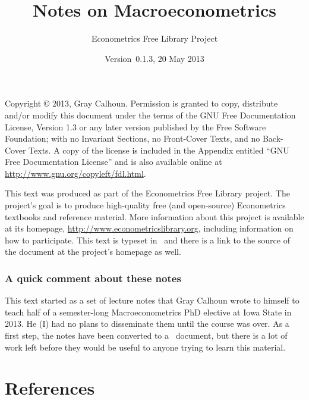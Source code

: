 \documentclass{tex/tufte-handout}
\title{Notes on Macroeconometrics}
\author{Econometrics Free Library Project}
\date{Version~0.1.3, 20 May 2013}
\begin{document}
\maketitle

\bigskip\noindent%
Copyright © 2013, Gray Calhoun.  Permission is granted to copy,
distribute and/or modify this document under the terms of the GNU Free
Documentation License, Version 1.3 or any later version published by
the Free Software Foundation; with no Invariant Sections, no
Front-Cover Texts, and no Back-Cover Texts.  A copy of the license is
included in the Appendix entitled ``GNU Free Documentation License''
and is also available online at
\url{http://www.gnu.org/copyleft/fdl.html}.

This text was produced as part of the Econometrics Free Library
project.  The project's goal is to produce high-quality free (and
open-source) Econometrics textbooks and reference material.  More
information about this project is available at its homepage,
\url{http://www.econometricslibrary.org}, including information on how
to participate.  This text is typeset in \XeLaTeX\ and there is a link
to the source of the document at the project's homepage as well.

\tableofcontents

\section{A quick comment about these notes}
This text started as a set of lecture notes that Gray Calhoun wrote to
himself to teach half of a semester-long Macroeconometrics PhD
elective at Iowa State in 2013.  He (I) had no plans to disseminate
them until the course was over.  As a first step, the notes have been
converted to a \XeLaTeX\ document, but there is a lot of work left
before they would be useful to anyone trying to learn this material.






\appendix


\part*{References}

\end{document}
